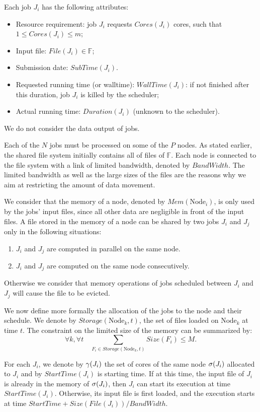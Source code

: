 \documentclass[conference,10pt]{IEEEtran}
\newcommand{\Node}[1]{\ensuremath{\mathrm{Node}_{#1}}\xspace}
\newcommand{\file}{\ensuremath{\mathit{File}}\xspace}
\newcommand{\storage}{\ensuremath{\mathit{Storage}}\xspace}
\newcommand{\size}{\ensuremath{\mathit{Size}}\xspace}
\newcommand{\memory}{\ensuremath{\mathit{Mem}}\xspace}
\newcommand{\duration}{\mathit{Duration}\xspace}
\newcommand{\bandwidth}{\mathit{BandWidth}\xspace}
\newcommand{\core}{\mathit{Cores}\xspace}
\newcommand{\submissiontime}{\mathit{SubTime}\xspace}
\newcommand{\walltime}{\mathit{WallTime}\xspace}
\newcommand{\start}{\mathit{StartTime}\xspace}
\newcommand{\allocatednode}{\ensuremath\mathit{\sigma}\xspace}
\newcommand{\allocatedcores}{\ensuremath\mathit{\gamma}\xspace}
\newcommand{\fileset}{\ensuremath{\mathbb{F}}\xspace}
\begin{document}
Each job $J_i$ has the following attributes:
\begin{itemize}
\item Resource requirement: job $J_i$ requests $\core(J_i)$  cores, such that $1 \leq \core(J_i) \leq m$;
\item Input file: $\file(J_i) \in \fileset$;
\item Submission date: $\submissiontime(J_i)$.
\item Requested running time (or walltime): $\walltime(J_i)$: if not
  finished after this duration, job $J_i$ is killed by the scheduler;
\item Actual running time: $\duration(J_i)$ (unknown to  the scheduler).
\end{itemize}

We do not consider the data output of jobs.

Each of the $N$ jobs must be processed on some of the $P$ nodes.  As
stated earlier, the shared file system initially contains all of files
of $\fileset$.  Each node is connected to the file system with a link
of limited bandwidth, denoted by $\bandwidth$.  The limited bandwidth
as well as the large sizes of the files are the reasons why we aim at
restricting the amount of data movement.

We consider that the memory of a node, denoted by $\memory(\Node{i})$,
is only used by the jobs' input files, since all other data are
negligible in front of the input files.
A file stored in the memory of a node can be shared by two jobs $J_i$ and $J_j$ only in the following situations:
\begin{enumerate}
	\item $J_i$ and $J_j$ are computed in parallel on the same node.
	\item $J_i$ and $J_j$ are computed on the same node consecutively.
\end{enumerate}
Otherwise we consider that memory operations of jobs scheduled between
$J_i$ and $J_j$ will cause the file to be evicted.

We now define more formally the allocation of the jobs to the node and
their schedule.
We denote by $\storage(\Node{k}, t)$, the set of files loaded on $\Node{k}$
at time $t$. The constraint on the limited size of the memory can be
summarized by:
$$
\forall k,\forall t \quad \sum_{F_i\in \storage(\Node{k},t)} \size(F_i)\leq M.
$$

For each $J_i$, we denote by
$\allocatedcores(J_i)$ the set of cores of the same node
$\allocatednode(J_i)$ allocated to $J_i$ and by
$\start(J_i)$ is starting time. If at this time, the input file of
$J_i$ is already in the memory of $\allocatednode(J_i)$, then $J_i$
can start its execution at time $\start(J_i)$. Otherwise, its input
file is first loaded, and the execution starts at time 
$\start+\size(\file(J_i))/\bandwidth$.
\end{document}

